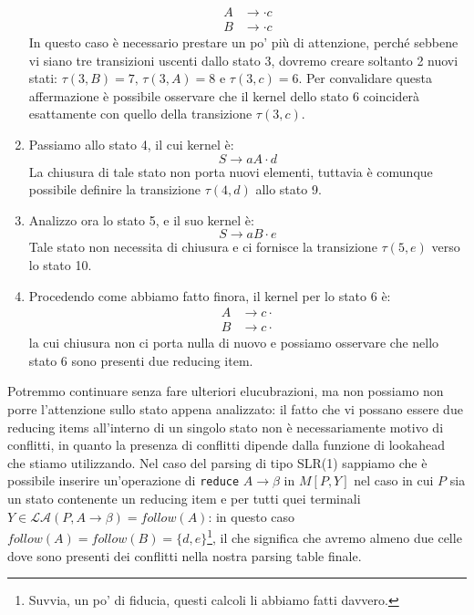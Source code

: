 \documentclass[class=book, crop=false, oneside, 12pt]{standalone}
\begin{document}
\begin{enumerate}
    \begin{align*}
        A &\to \cdot c \\
        B &\to \cdot c
    \end{align*}
    In questo caso è necessario prestare un po' più di attenzione, perché sebbene vi siano tre transizioni uscenti dallo stato 3, dovremo creare soltanto 2 nuovi stati: \(\tau(3,B)=7 \textrm{, } \tau(3,A)=8 \textrm{ e } \tau(3,c)=6\). Per convalidare questa affermazione è possibile osservare che il kernel dello stato 6 coinciderà esattamente con quello della transizione \(\tau(3, c)\).
    \item Passiamo allo stato 4, il cui kernel è:
    \begin{equation*}
        S \to aA \cdot d 
    \end{equation*}
   La chiusura di tale stato non porta nuovi elementi, tuttavia è comunque possibile definire la transizione \(\tau(4,d)\) allo stato 9.
    \item Analizzo ora lo stato 5, e il suo kernel è:
    \begin{equation*}
        S \to aB \cdot e
    \end{equation*}
    Tale stato non necessita di chiusura e ci fornisce la transizione \(\tau(5,e)\) verso lo stato 10.
    \item Procedendo come abbiamo fatto finora, il kernel per lo stato 6 è:
    \begin{align*}
        A &\to c \cdot \\
        B &\to c \cdot
    \end{align*}
    la cui chiusura non ci porta nulla di nuovo e possiamo osservare che nello stato 6 sono presenti due reducing item.
\end{enumerate}

Potremmo continuare senza fare ulteriori elucubrazioni, ma non possiamo non porre l'attenzione sullo stato appena analizzato: il fatto che vi possano essere due reducing items all'interno di un singolo stato non è necessariamente motivo di conflitti, in quanto la presenza di conflitti dipende dalla funzione di lookahead che stiamo utilizzando. Nel caso del parsing di tipo SLR(1) sappiamo che è possibile inserire un'operazione di \texttt{reduce} \(A \rightarrow \beta\) in \(M[P, Y]\) nel caso in cui \(P\) sia un stato contenente un reducing item e per tutti quei terminali \(Y \in \mathcal{LA}(P, A \rightarrow \beta) = follow(A)\): in questo caso \(follow(A) = follow(B) = \{d, e\}\)\footnote{Suvvia, un po' di fiducia, questi calcoli li abbiamo fatti davvero.}, il che significa che avremo almeno due celle dove sono presenti dei conflitti nella nostra parsing table finale.
\end{document}
